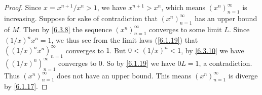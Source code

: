 \begin{proof}
  Since \(x = x^{n + 1} / x^n > 1\), we have \(x^{n + 1} > x^n\), which means \((x^n)_{n = 1}^\infty\) is increasing.
  Suppose for sake of contradiction that \((x^n)_{n = 1}^\infty\) has an upper bound of \(M\).
  Then by \cref{6.3.8} the sequence \((x^n)_{n = 1}^\infty\) converges to some limit \(L\).
  Since \((1 / x)^n x^n = 1\), we thus see from the limit laws (\cref{6.1.19}) that \(((1 / x)^n x^n)_{n = 1}^\infty\) converges to \(1\).
  But \(0 < (1 / x)^n < 1\), by \cref{6.3.10} we have \(((1 / x)^n)_{n = 1}^\infty\) converges to \(0\).
  So by \cref{6.1.19} we have \(0L = 1\), a contradiction.
  Thus \((x^n)_{n = 1}^\infty\) does not have an upper bound.
  This means \((x^n)_{n = 1}^\infty\) is diverge by \cref{6.1.17}.
\end{proof}
